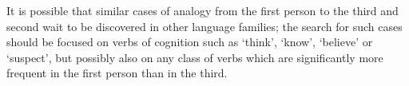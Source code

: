 \documentclass[oldfontcommands,oneside,a4paper,11pt]{article}
\begin{document}
It is possible that similar cases of analogy from the first person to the third and second wait to be discovered in other language families; the search for such cases should be focused on verbs of cognition such as `think',  `know', `believe' or `suspect', but possibly also on any class of verbs which are significantly more frequent in the first person than in the third.
   

 



\end{document}
